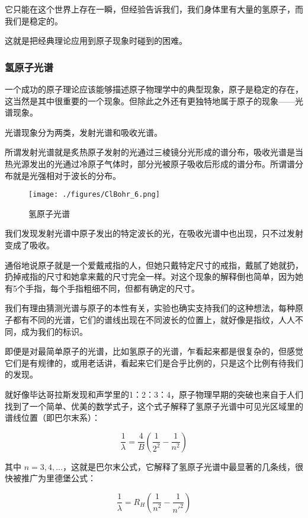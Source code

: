 它只能在这个世界上存在一瞬，但经验告诉我们，我们身体里有大量的氢原子，而我们是稳定的。

这就是把经典理论应用到原子现象时碰到的困难。

\subsubsection{氢原子光谱}


一个成功的原子理论应该能够描述原子物理学中的典型现象，原子是稳定的存在，这当然是其中很重要的一个现象。但除此之外还有更独特地属于原子的现象——光谱现象。

光谱现象分为两类，发射光谱和吸收光谱。

所谓发射光谱就是炙热原子发射的光通过三棱镜分光形成的谱分布，吸收光谱是当热光源发出的光通过冷原子气体时，部分光被原子吸收后形成的谱分布。所谓谱分布就是光强相对于波长的分布。

\begin{figure}[ht]
\centering
\texttt{[image: ./figures/ClBohr\_6.png]}
\caption{氢原子光谱} \label{ClBohr_fig6}
\end{figure}


我们发现发射光谱中原子发出的特定波长的光，在吸收光谱中也出现，只不过发射变成了吸收。

通俗地说原子就是一个爱戴戒指的人，但她只戴特定尺寸的戒指，戴腻了她就扔，扔掉戒指的尺寸和她拿来戴的尺寸完全一样。对这个现象的解释倒也简单，因为她有5个手指，每个手指粗细不同，但都有确定的尺寸。

我们有理由猜测光谱与原子的本性有关，实验也确实支持我们的这种想法，每种原子都有不同的光谱，它们的谱线出现在不同波长的位置上，就好像是指纹，人人不同，成为我们的标识。

即便是对最简单原子的光谱，比如氢原子的光谱，乍看起来都是很复杂的，但感觉它们是有规律的，或用老话讲，看起来它们是合乎比例的，只是这个比例有待我们的发现。

就好像毕达哥拉斯发现和声学里的1：2：3：4，原子物理早期的突破也来自于人们找到了一个简单、优美的数学式子，这个式子解释了氢原子光谱中可见光区域里的谱线位置（即巴尔末系）：

\begin{equation}
\frac{1}{\lambda} = \frac{4}{B} \left( \frac{1}{2^2} - \frac{1}{n^2} \right)
\end{equation}

其中 $n = 3, 4, ...$，这就是巴尔末公式，它解释了氢原子光谱中最显著的几条线，很快被推广为里德堡公式：

\begin{equation}
\frac{1}{\lambda} = R_H \left(  \frac{1}{n^2} - \frac{1}{n'^2}  \right)
\end{equation}

